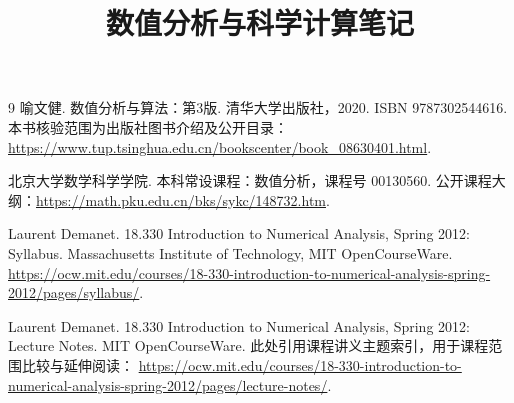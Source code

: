 \documentclass[UTF8,12pt,a4paper,fontset=fandol]{ctexbook}
\title{数值分析与科学计算笔记}
\author{}
\date{}
\begin{document}
\frontmatter %

\maketitle
\tableofcontents

\mainmatter















\appendix


\begin{thebibliography}{9}
喻文健. 数值分析与算法：第3版. 清华大学出版社，2020.
ISBN 9787302544616.
本书核验范围为出版社图书介绍及公开目录：
\url{https://www.tup.tsinghua.edu.cn/bookscenter/book_08630401.html}.

北京大学数学科学学院. 本科常设课程：数值分析，课程号 00130560.
公开课程大纲：\url{https://math.pku.edu.cn/bks/sykc/148732.htm}.

Laurent Demanet. 18.330 Introduction to Numerical Analysis, Spring 2012: Syllabus.
Massachusetts Institute of Technology, MIT OpenCourseWare.
\url{https://ocw.mit.edu/courses/18-330-introduction-to-numerical-analysis-spring-2012/pages/syllabus/}.

Laurent Demanet. 18.330 Introduction to Numerical Analysis, Spring 2012: Lecture Notes.
MIT OpenCourseWare. 此处引用课程讲义主题索引，用于课程范围比较与延伸阅读：
\url{https://ocw.mit.edu/courses/18-330-introduction-to-numerical-analysis-spring-2012/pages/lecture-notes/}.
\end{thebibliography}

\end{document}

